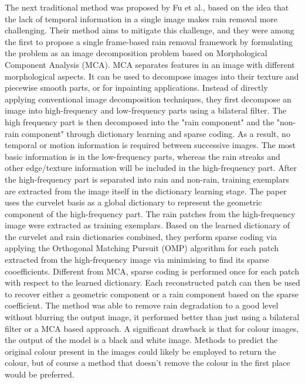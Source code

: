 \documentclass[11pt]{ociamthesis}  %
\begin{document}
The next traditional method was proposed by Fu et al.\cite{Fu5946766}, based on the idea that the lack of temporal information in a single image makes rain removal more challenging. Their method aims to mitigate this challenge, and they were among the first to propose a single frame-based rain removal framework by formulating the problem as an image decomposition problem based on Morphological Component Analysis (MCA)\cite{MCA10.1117/12.615237}. MCA separates features in an image with different morphological aspects. It can be used to decompose images into their texture and piecewise smooth parts, or for inpainting applications. Instead of directly applying conventional image decomposition techniques, they first decompose an image into high-frequency and low-frequency parts using a bilateral filter\cite{BilateralFiltering}. The high frequency part is then decomposed into the "rain component" and the "non-rain component" through dictionary learning and sparse coding\cite{DictionaryLearningForSparseCoding}\cite{SparseRepresentations}. As a result, no temporal or motion information is required between successive images. The most basic information is in the low-frequency parts, whereas the rain streaks and other edge/texture information will be included in the high-frequency part. After the high-frequency part is separated into rain and non-rain, training exemplars are extracted from the image itself in the dictionary learning stage. The paper uses the curvelet basis\cite{Curvelet} as a global dictionary to represent the geometric component of the high-frequency part. The rain patches from the high-frequency image were extracted as training exemplars. Based on the learned dictionary of the curvelet and rain dictionaries combined, they perform sparse coding via applying the Orthogonal Matching Pursuit (OMP)\cite{OMP} algorithm for each patch extracted from the high-frequency image via minimising to find its sparse cooefficients. Different from MCA, sparse coding is performed once for each patch with respect to the learned dictionary. Each reconstructed patch can then be used to recover either a geometric component or a rain component based on the sparse coefficient. The method was able to remove rain degradation to a good level without blurring the output image, it performed better than just using a bilateral filter or a MCA based approach. A significant drawback is that for colour images, the output of the model is a black and white image. Methods to predict the original colour present in the images could likely be employed to return the colour, but of course a method that doesn't remove the colour in the first place would be preferred.
\end{document}
